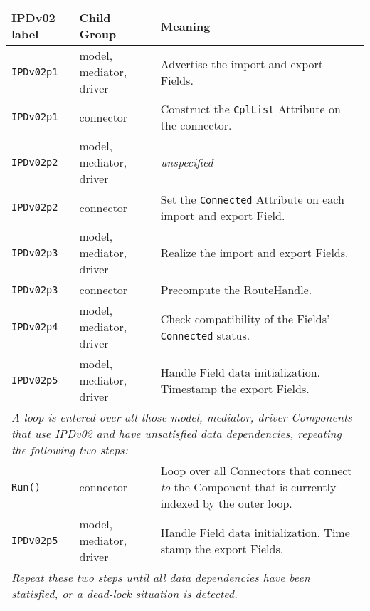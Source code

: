 \vspace*{3ex}
\begin{tabular}[h]{|p{35mm}|p{4cm}|p{6cm}|}
     \hline\hline
     {\bf IPDv02 label} & {\bf Child Group} & {\bf Meaning}\\
     \hline\hline
     {\tt IPDv02p1} & model, mediator, driver & Advertise the import and export Fields.\\ \hline
     {\tt IPDv02p1} & connector               & Construct the {\tt CplList} Attribute on the connector.\\ \hline
     {\tt IPDv02p2} & model, mediator, driver & {\em unspecified}\\ \hline
     {\tt IPDv02p2} & connector               & Set the {\tt Connected} Attribute on each import and export Field.\\ \hline
     {\tt IPDv02p3} & model, mediator, driver & Realize the import and export Fields.\\ \hline
     {\tt IPDv02p3} & connector               & Precompute the RouteHandle.\\ \hline
     {\tt IPDv02p4} & model, mediator, driver & Check compatibility of the Fields' {\tt Connected} status.\\ \hline
     {\tt IPDv02p5} & model, mediator, driver & Handle Field data initialization. Timestamp the export Fields.\\ \hline
     \multicolumn{3}{|p{13.5cm}|}{\it A loop is entered over all those model, mediator, driver Components that use IPDv02 and have
     unsatisfied data dependencies, repeating the following two steps:}\\ \hline
     {\tt Run()}    & connector               & Loop over all Connectors that connect {\it to} the Component that is currently indexed by the outer loop.\\ \hline
     {\tt IPDv02p5} & model, mediator, driver & Handle Field data initialization. Time stamp the export Fields.\\ \hline
     \multicolumn{3}{|p{13.5cm}|}{\it Repeat these two steps until all data
     dependencies have been statisfied, or a dead-lock situation is detected.}\\ 
     \hline\hline
\end{tabular}\newline
